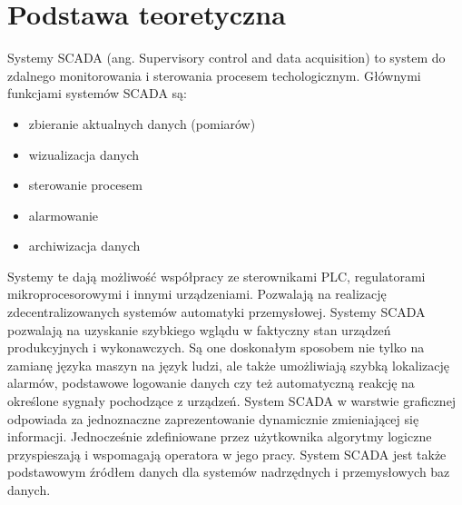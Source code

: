 \clearpage
\section{Podstawa teoretyczna}
\label{sec:podstawa}


\hspace{2em}Systemy SCADA (ang. Supervisory control and data acquisition) to system do zdalnego monitorowania i sterowania procesem techologicznym. Głównymi funkcjami systemów SCADA są:

\begin{itemize}
	\item zbieranie aktualnych danych (pomiarów)
	\item wizualizacja danych
	\item sterowanie procesem
	\item alarmowanie
	\item archiwizacja danych	
\end{itemize}

\hspace{2em}Systemy te dają możliwość współpracy ze sterownikami PLC, regulatorami mikroprocesorowymi i innymi urządzeniami. Pozwalają na realizację zdecentralizowanych systemów automatyki przemysłowej. Systemy SCADA pozwalają na uzyskanie szybkiego wglądu w faktyczny stan urządzeń produkcyjnych i wykonawczych. Są one doskonałym sposobem nie tylko na zamianę języka maszyn na język ludzi, ale także umożliwiają szybką lokalizację alarmów, podstawowe logowanie danych czy też automatyczną reakcję na określone sygnały pochodzące z urządzeń. System SCADA w warstwie graficznej odpowiada za jednoznaczne zaprezentowanie dynamicznie zmieniającej się informacji. Jednocześnie zdefiniowane przez użytkownika algorytmy logiczne przyspieszają i wspomagają operatora w jego pracy. System SCADA jest także podstawowym źródłem danych dla systemów nadrzędnych i przemysłowych baz danych.

